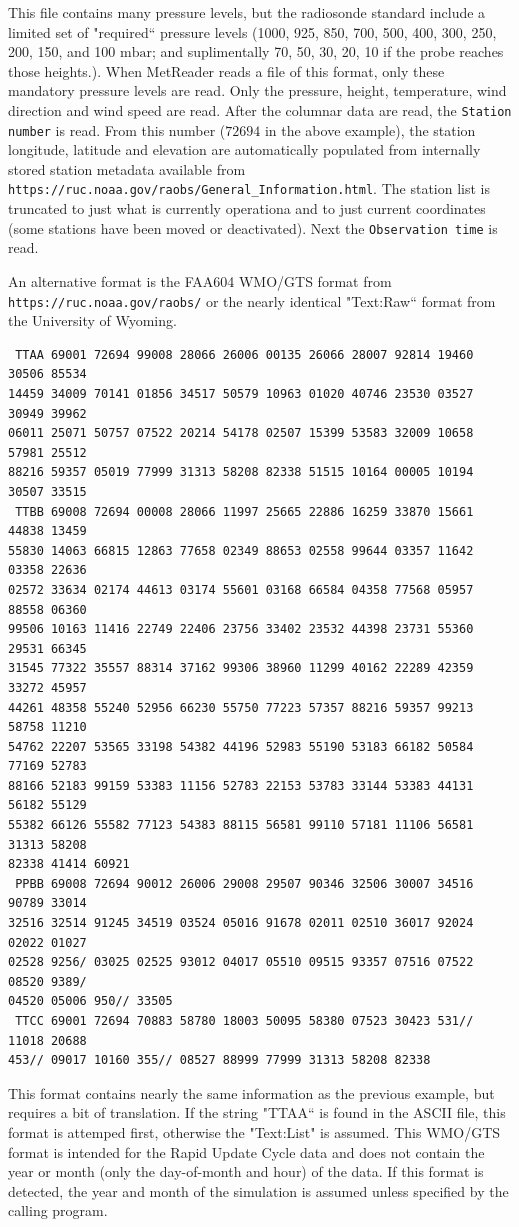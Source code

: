 \documentclass[11pt]{article}   %
\begin{document}
This file contains many pressure levels, but the radiosonde standard include
a limited set of "required`` pressure levels (1000, 925, 850, 700, 500,
400, 300, 250, 200, 150, and 100 $\mathrm{mbar}$; and suplimentally
70, 50, 30, 20, 10 if the probe reaches those heights.).
When MetReader reads a file of this format, only these mandatory pressure levels are
read.  Only the pressure, height, temperature, wind direction and wind speed are read.
After the columnar data are read, the \texttt{Station number} is read.  From this number
($72694$ in the above example), the station longitude, latitude and elevation are
automatically populated from internally stored station
metadata available from \texttt{https://ruc.noaa.gov/raobs/General\_Information.html}.  The
station list is truncated to just what is currently operationa and to just current
coordinates (some stations have been moved or deactivated).
Next the \texttt{Observation time} is read.  

An alternative format is the FAA604 WMO/GTS format from \texttt{https://ruc.noaa.gov/raobs/}
or the nearly identical "Text:Raw`` format from the University of Wyoming.

\begin{verbatim}
 TTAA 69001 72694 99008 28066 26006 00135 26066 28007 92814 19460 30506 85534
14459 34009 70141 01856 34517 50579 10963 01020 40746 23530 03527 30949 39962
06011 25071 50757 07522 20214 54178 02507 15399 53583 32009 10658 57981 25512
88216 59357 05019 77999 31313 58208 82338 51515 10164 00005 10194 30507 33515
 TTBB 69008 72694 00008 28066 11997 25665 22886 16259 33870 15661 44838 13459
55830 14063 66815 12863 77658 02349 88653 02558 99644 03357 11642 03358 22636
02572 33634 02174 44613 03174 55601 03168 66584 04358 77568 05957 88558 06360
99506 10163 11416 22749 22406 23756 33402 23532 44398 23731 55360 29531 66345
31545 77322 35557 88314 37162 99306 38960 11299 40162 22289 42359 33272 45957
44261 48358 55240 52956 66230 55750 77223 57357 88216 59357 99213 58758 11210
54762 22207 53565 33198 54382 44196 52983 55190 53183 66182 50584 77169 52783
88166 52183 99159 53383 11156 52783 22153 53783 33144 53383 44131 56182 55129
55382 66126 55582 77123 54383 88115 56581 99110 57181 11106 56581 31313 58208
82338 41414 60921
 PPBB 69008 72694 90012 26006 29008 29507 90346 32506 30007 34516 90789 33014
32516 32514 91245 34519 03524 05016 91678 02011 02510 36017 92024 02022 01027
02528 9256/ 03025 02525 93012 04017 05510 09515 93357 07516 07522 08520 9389/
04520 05006 950// 33505
 TTCC 69001 72694 70883 58780 18003 50095 58380 07523 30423 531// 11018 20688
453// 09017 10160 355// 08527 88999 77999 31313 58208 82338
\end{verbatim}
This format contains nearly the same information as the previous example, but 
requires a bit of translation.  If the string "TTAA`` is found
in the ASCII file, this format is attemped first, otherwise the "Text:List" is
assumed.  This WMO/GTS format is intended for the Rapid Update Cycle data and
does not contain the year or month (only the day-of-month and hour) of the data.
If this format is detected, the year and month of the simulation is assumed unless
specified by the calling program.
\end{document}
